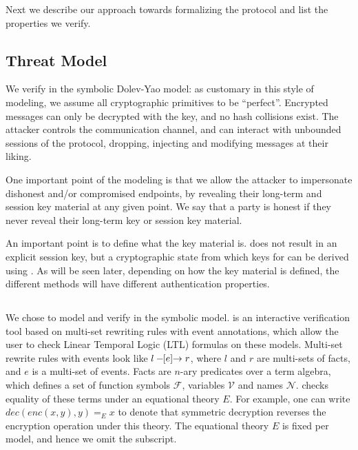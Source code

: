  
Next we describe our approach towards formalizing the \mEdhoc{} protocol and list the properties we verify. %
%
%
\subsection{Threat Model}\label{sec:threat-model}
We verify \mEdhoc{} in the symbolic Dolev-Yao model: as customary in this style of
modeling, we assume all cryptographic primitives to be ``perfect''. Encrypted messages can only be decrypted with the key, and no hash collisions exist. The attacker controls the
 communication channel, and can interact with unbounded sessions of the protocol,
dropping, injecting and modifying messages at their liking.

One important point of the modeling is that we allow the attacker to impersonate
dishonest and/or compromised endpoints, by revealing their long-term and session
key material at any given point.
%
We say that a party is honest if they never reveal their
long-term key or session key material.

An important point is to define what the key material is.
    \mEdhoc{} does not result in an explicit session key, but a cryptographic
    state from which keys for \mOscore{} can be derived using \mHkdf.
    As will be seen later, depending on how the key material is defined, the
    different methods will have different authentication properties.

\subsection{\mTamarin{}}
\label{sec:tamarin}
 
We chose \mTamarin{} to model and verify \mEdhoc{} in the symbolic model.
%
\mTamarin{} is an interactive verification tool based on multi-set rewriting rules
with event annotations, which allow the user to check Linear Temporal Logic
(LTL) formulas on these models.
%
Multi-set rewrite rules with events look like $ l \ifarrow[e] r $,
where $l$ and $r$ are multi-sets of facts, and $e$ is a multi-set of events.
Facts are $n$-ary predicates over a term algebra, which defines a set of function
symbols $\mathcal F$, variables $\mathcal V$ and names $\mathcal N$. \mTamarin{}
checks equality of these terms under an equational theory $E$. For example,
one can write $ dec(enc(x,y),y) =_E x $
to denote that symmetric decryption reverses the encryption operation under this theory.
The equational theory $E$ is fixed per model, and hence we omit the subscript.

